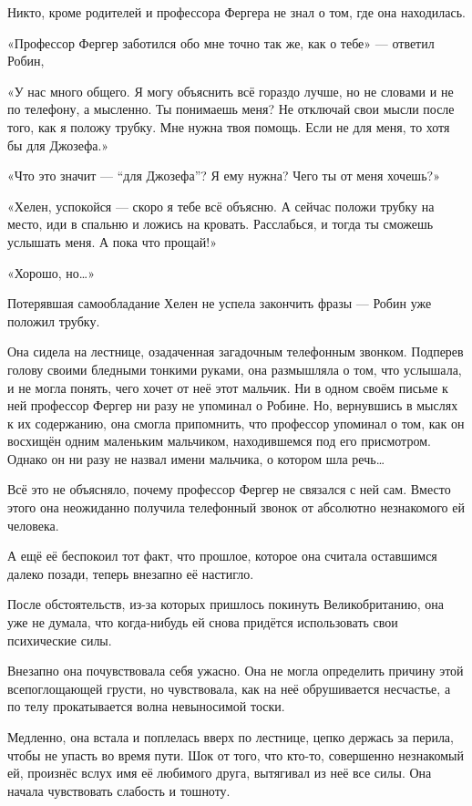 \documentclass[a5paper, 9pt,
final, openany, twoside=true]{memoir}
\begin{document}
Никто, кроме родителей и профессора Фергера не знал о том, где она находилась.

«Профессор Фергер заботился обо мне точно так же, как о тебе» — ответил Робин,

«У нас много общего. Я могу объяснить всё гораздо лучше, но не словами и не по телефону, а мысленно. Ты понимаешь меня? Не отключай свои мысли после того, как я положу трубку. Мне нужна твоя помощь. Если не для меня, то хотя бы для Джозефа.»

«Что это значит — ``для Джозефа''? Я ему нужна? Чего ты от меня хочешь?»

«Хелен, успокойся — скоро я тебе всё объясню. А сейчас положи трубку на место, иди в спальню и ложись на кровать. Расслабься, и тогда ты сможешь услышать меня. А пока что прощай!»

«Хорошо, но…»

Потерявшая самообладание Хелен не успела закончить фразы — Робин уже положил трубку.\bigskip

Она сидела на лестнице, озадаченная загадочным телефонным звонком. Подперев голову своими бледными тонкими руками, она размышляла о том, что услышала, и не могла понять, чего хочет от неё этот мальчик. Ни в одном своём письме к ней профессор Фергер ни разу не упоминал о Робине. Но, вернувшись в мыслях к их содержанию, она смогла припомнить, что профессор упоминал о том, как он восхищён одним маленьким мальчиком, находившемся под его присмотром. Однако он ни разу не назвал имени мальчика, о котором шла речь…

Всё это не объясняло, почему профессор Фергер не связался с ней сам. Вместо этого она неожиданно получила телефонный звонок от абсолютно незнакомого ей человека.

А ещё её беспокоил тот факт, что прошлое, которое она считала оставшимся далеко позади, теперь внезапно её настигло.

После обстоятельств, из-за которых пришлось покинуть Великобританию, она уже не думала, что когда-нибудь ей снова придётся использовать свои психические силы.

Внезапно она почувствовала себя ужасно. Она не могла определить причину этой всепоглощающей грусти, но чувствовала, как на неё обрушивается несчастье, а по телу прокатывается волна невыносимой тоски.

Медленно, она встала и поплелась вверх по лестнице, цепко держась за перила, чтобы не упасть во время пути. Шок от того, что кто-то, совершенно незнакомый ей, произнёс вслух имя её любимого друга, вытягивал из неё все силы. Она начала чувствовать слабость и тошноту.\bigskip
\end{document}
